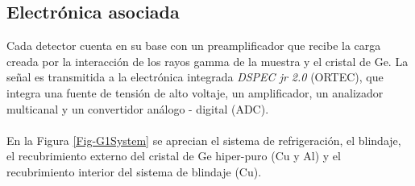 		\subsection{Electrónica asociada}\label{SubSec-Electronica}
Cada detector cuenta en su base con un preamplificador que recibe la carga creada por la interacción de los rayos gamma de la muestra y el cristal de Ge. La señal es transmitida a la electrónica integrada \textit{DSPEC jr 2.0} (ORTEC), que integra una fuente de tensión de alto voltaje, un amplificador, un analizador multicanal y un convertidor análogo - digital (ADC).
\\
\\
En la  Figura \ref{Fig-G1System} se aprecian el sistema de refrigeración, el blindaje, el recubrimiento externo del cristal de Ge hiper-puro (Cu y Al) y el recubrimiento interior del sistema de blindaje (Cu).
